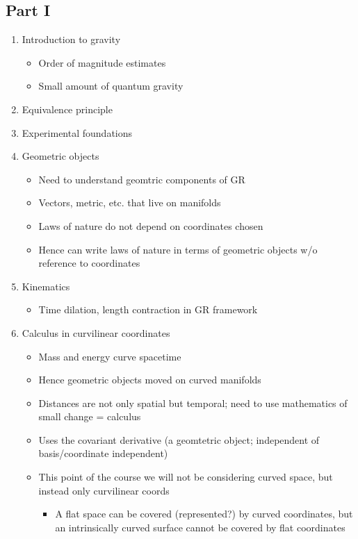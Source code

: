 \documentclass[a4paper]{article} %
\begin{document}
\subsection{Part I}
\begin{enumerate}
\item Introduction to gravity
\begin{itemize}
\item Order of magnitude estimates
\item Small amount of quantum gravity
\end{itemize}
\item Equivalence principle
\item Experimental foundations
\item Geometric objects
\begin{itemize}
\item Need to understand geomtric components of GR
\item Vectors, metric, etc. that live on manifolds
\item Laws of nature do not depend on coordinates chosen
\item Hence can write laws of nature in terms of geometric objects w/o reference to coordinates
\end{itemize}
\item Kinematics
\begin{itemize}
\item Time dilation, length contraction in GR framework
\end{itemize}
\item Calculus in curvilinear coordinates
\begin{itemize}
\item Mass and energy curve spacetime
\item Hence geometric objects moved on curved manifolds
\item Distances are not only spatial but temporal; need to use mathematics of small change = calculus
\item Uses the covariant derivative (a geomtetric object; independent of basis/coordinate independent)
\item This point of the course we will not be considering curved space, but instead only curvilinear coords 
\begin{itemize}
\item A flat space can be covered (represented?) by curved coordinates, but an intrinsically curved surface cannot be covered by flat coordinates
\end{itemize}

\end{itemize}
\end{enumerate}
\end{document}
